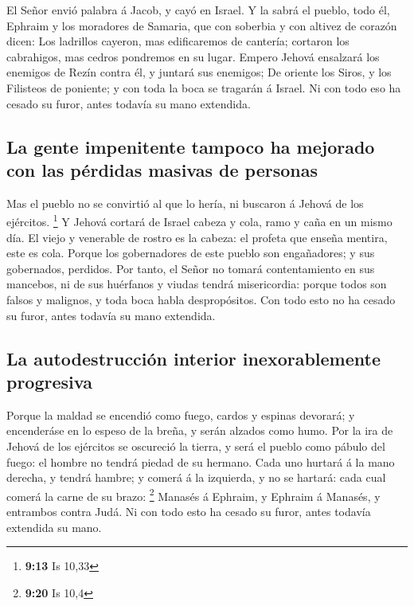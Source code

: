  El Señor envió palabra á Jacob, y cayó en Israel.
 Y la sabrá el pueblo, todo él, Ephraim y los moradores de
Samaria, que con soberbia y con altivez de corazón dicen:
 Los ladrillos cayeron, mas edificaremos de cantería;
cortaron los cabrahigos, mas cedros pondremos en su lugar.
 Empero Jehová ensalzará los enemigos de Rezín contra él,
y juntará sus enemigos;  De oriente los Siros, y los
Filisteos de poniente; y con toda la boca se tragarán á Israel. Ni con
todo eso ha cesado su furor, antes todavía su mano extendida.

\hypertarget{la-gente-impenitente-tampoco-ha-mejorado-con-las-puxe9rdidas-masivas-de-personas}{%
\subsection{La gente impenitente tampoco ha mejorado con las pérdidas
masivas de
personas}\label{la-gente-impenitente-tampoco-ha-mejorado-con-las-puxe9rdidas-masivas-de-personas}}

 Mas el pueblo no se convirtió al que lo hería, ni
buscaron á Jehová de los ejércitos. \footnote{\textbf{9:13} Is 10,33}
 Y Jehová cortará de Israel cabeza y cola, ramo y caña en
un mismo día.  El viejo y venerable de rostro es la
cabeza: el profeta que enseña mentira, este es cola. 
Porque los gobernadores de este pueblo son engañadores; y sus
gobernados, perdidos.  Por tanto, el Señor no tomará
contentamiento en sus mancebos, ni de sus huérfanos y viudas tendrá
misericordia: porque todos son falsos y malignos, y toda boca habla
despropósitos. Con todo esto no ha cesado su furor, antes todavía su
mano extendida.

\hypertarget{la-autodestrucciuxf3n-interior-inexorablemente-progresiva}{%
\subsection{La autodestrucción interior inexorablemente
progresiva}\label{la-autodestrucciuxf3n-interior-inexorablemente-progresiva}}

 Porque la maldad se encendió como fuego, cardos y
espinas devorará; y encenderáse en lo espeso de la breña, y serán
alzados como humo.  Por la ira de Jehová de los ejércitos
se oscureció la tierra, y será el pueblo como pábulo del fuego: el
hombre no tendrá piedad de su hermano.  Cada uno hurtará
á la mano derecha, y tendrá hambre; y comerá á la izquierda, y no se
hartará: cada cual comerá la carne de su brazo: \footnote{\textbf{9:20}
  Is 10,4}  Manasés á Ephraim, y Ephraim á Manasés, y
entrambos contra Judá. Ni con todo esto ha cesado su furor, antes
todavía extendida su mano.


